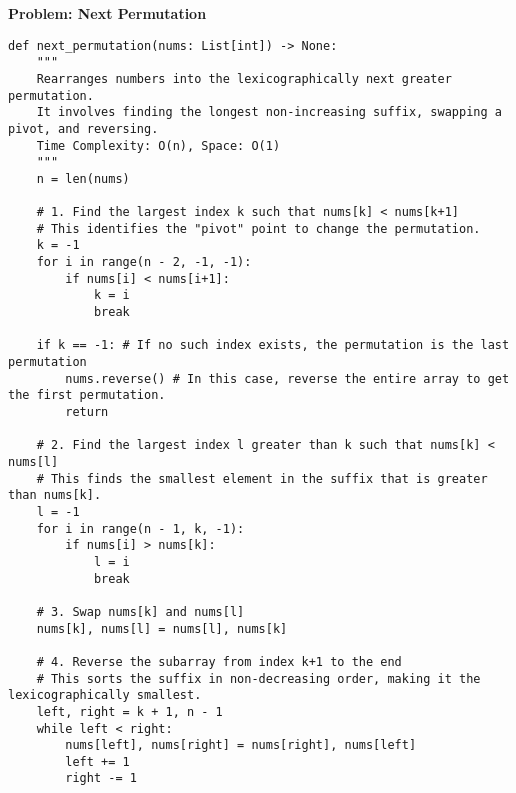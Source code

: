 \noindent\textbf{Problem: Next Permutation}
\begin{verbatim}
def next_permutation(nums: List[int]) -> None:
    """
    Rearranges numbers into the lexicographically next greater permutation.
    It involves finding the longest non-increasing suffix, swapping a pivot, and reversing.
    Time Complexity: O(n), Space: O(1)
    """
    n = len(nums)
    
    # 1. Find the largest index k such that nums[k] < nums[k+1]
    # This identifies the "pivot" point to change the permutation.
    k = -1
    for i in range(n - 2, -1, -1):
        if nums[i] < nums[i+1]:
            k = i
            break
    
    if k == -1: # If no such index exists, the permutation is the last permutation
        nums.reverse() # In this case, reverse the entire array to get the first permutation.
        return

    # 2. Find the largest index l greater than k such that nums[k] < nums[l]
    # This finds the smallest element in the suffix that is greater than nums[k].
    l = -1
    for i in range(n - 1, k, -1):
        if nums[i] > nums[k]:
            l = i
            break
            
    # 3. Swap nums[k] and nums[l]
    nums[k], nums[l] = nums[l], nums[k]
    
    # 4. Reverse the subarray from index k+1 to the end
    # This sorts the suffix in non-decreasing order, making it the lexicographically smallest.
    left, right = k + 1, n - 1
    while left < right:
        nums[left], nums[right] = nums[right], nums[left]
        left += 1
        right -= 1
\end{verbatim}

